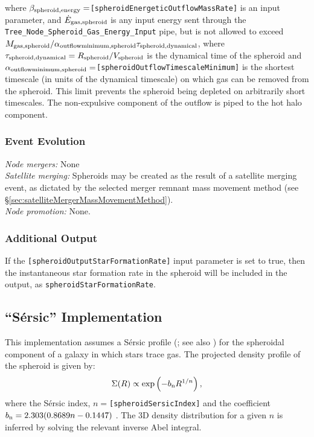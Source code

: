 where $\beta_{\rm spheroid, energy}=${\tt [spheroidEnergeticOutflowMassRate]} is an input parameter, and $\dot{E}_{\rm gas,spheroid}$ is any input energy sent through the {\tt Tree\_Node\_Spheroid\_Gas\_Energy\_Input} pipe, but is not allowed to exceed $M_{\rm gas, spheroid}/ \alpha_{\rm outflow minimum, spheroid} \tau_{\rm spheroid, dynamical}$, where $\tau_{\rm spheroid, dynamical}=R_{\rm spheroid}/V_{\rm spheroid}$ is the dynamical time of the spheroid and $\alpha_{\rm outflow minimum, spheroid}=${\tt [spheroidOutflowTimescaleMinimum]} is the shortest timescale (in units of the dynamical timescale) on which gas can be removed from the spheroid. This limit prevents the spheroid being depleted on arbitrarily short timescales. The non-expulsive \gls{component} of the outflow is piped to the hot halo component.

\subsubsection{Event Evolution}

\noindent\emph{Node mergers:} None\\

\noindent\emph{Satellite merging:} Spheroids may be created as the result of a satellite merging event, as dictated by the selected merger remnant mass movement method (see \S\ref{sec:satelliteMergerMassMovementMethod}).\\

\noindent\emph{Node promotion:} None.\\

\subsubsection{Additional Output}

If the {\tt [spheroidOutputStarFormationRate]} input parameter is set to true, then the instantaneous star formation rate in the spheroid will be included in the output, as {\tt spheroidStarFormationRate}.

\subsection{``S\'ersic'' Implementation}

This implementation assumes a S\'ersic profile (\citealt{sersic_influence_1963}; see also \citealt{mazure_exact_2002}) for the spheroidal \gls{component} of a galaxy in which stars trace gas. The projected density profile of the spheroid is given by:
\begin{equation}
 \Sigma(R) \propto \exp\left(-b_{\rm n} R^{1/n} \right),
\end{equation}
where the S\'ersic index, $n=${\tt [spheroidSersicIndex]} and the coefficient $b_{\rm n}=2.303(0.8689 n-0.1447)$ \cite{wadadekar_two-dimensional_1999}. The 3D density distribution for a given $n$ is inferred by solving the relevant inverse Abel integral.

